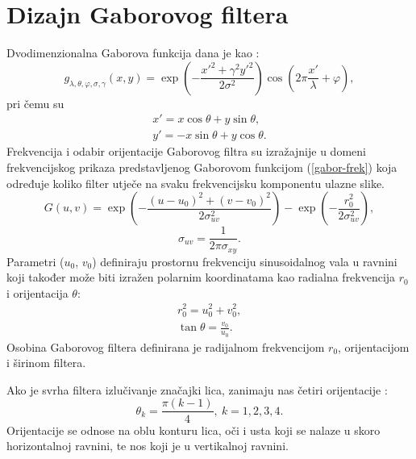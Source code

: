 \documentclass{article}
\begin{document}
\section{Dizajn Gaborovog filtera}
Dvodimenzionalna Gaborova funkcija dana je kao \citep{petkovgabor}:
\begin{equation}
g_{\lambda,\theta,\varphi,\sigma,\gamma}(x,y) = \exp\left ( -
\frac{x'^2+\gamma^2 y'^2}{2\sigma^2}\right ) \cos \left ( 2\pi \frac{x'}{\lambda} + \varphi \right ),
\label{2d-gabor}
\end{equation}
pri čemu su
\begin{eqnarray*}
x' = x \cos \theta + y \sin \theta, \\
y' = -x \sin \theta + y \cos \theta.
\end{eqnarray*}
Frekvencija i odabir orijentacije Gaborovog filtra su izražajnije u domeni
frekvencijskog prikaza predstavljenog Gaborovom funkcijom (\ref{gabor-frek}) koja
određuje koliko filter utječe na svaku frekvencijsku komponentu ulazne slike.
\begin{equation}
G(u,v) = \exp \left ( - \frac{(u-u_0)^2 + (v-v_0)^2}{2\sigma^2_{uv}}\right ) -
\exp \left ( - \frac{r_0^2}{2\sigma^2_{uv}} \right),
\label{gabor-frek}
\end{equation}
\begin{equation}
\sigma_{uv} = \frac{1}{2\pi \sigma_{xy}}.
\end{equation}
Parametri ($u_0$, $v_0$) definiraju prostornu frekvenciju sinusoidalnog vala u
ravnini koji također može biti izražen polarnim koordinatama kao radialna frekvencija $r_0$ i
orijentacija $\theta$:
\begin{eqnarray}
r_0^2 = u_0^2 + v_0^2, \\
\tan \theta = \frac{v_0}{u_0}.
\end{eqnarray}
Osobina Gaborovog filtera definirana je radijalnom frekvencijom $r_0$,
orijentacijom i širinom filtera.

Ako je svrha filtera izlučivanje značajki lica, zanimaju nas četiri orijentacije
\citep{huang2005robust}:
\begin{equation}
\theta_k = \frac{\pi(k-1)}{4},\: k = 1,2,3,4.
\label{equ:orijentacije}
\end{equation}
Orijentacije se odnose na oblu konturu lica, oči i usta koji se nalaze u skoro
horizontalnoj ravnini, te nos koji je u vertikalnoj ravnini.
\end{document}
